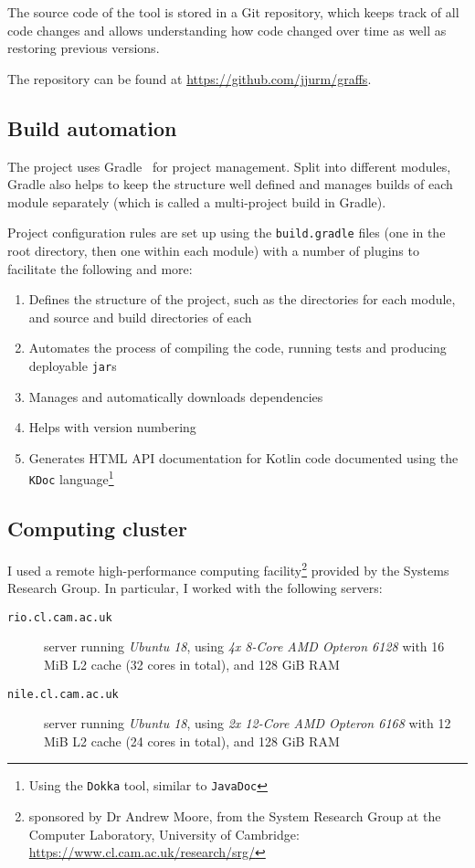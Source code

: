 The source code of the \graffs tool is stored in a Git repository, which keeps track of all code changes and allows understanding how code changed over time as well as restoring previous versions.

The repository can be found at \url{https://github.com/jjurm/graffs}.

\subsection{Build automation}

The project uses Gradle~\cite{BerglundBuildingTestingGradle2011} for project management.
Split into different modules, Gradle also helps to keep the structure well defined and manages builds of each module separately (which is called a multi-project build in Gradle).

Project configuration rules are set up using the \texttt{build.gradle} files (one in the root directory, then one within each module) with a number of plugins to facilitate the following and more:
\begin{enumerate}
    \item Defines the structure of the project, such as the directories for each module, and source and build directories of each
    \item Automates the process of compiling the code, running tests and producing deployable \texttt{jar}s
    \item Manages and automatically downloads dependencies
    \item Helps with version numbering
    \item Generates HTML API documentation for Kotlin code documented using the \texttt{KDoc} language\footnote{Using the \texttt{Dokka} tool, similar to \texttt{JavaDoc}}
\end{enumerate}

\subsection{Computing cluster}\label{sec:computing_cluster}

I used a remote high-performance computing facility\footnote{sponsored by Dr Andrew Moore, from the System Research Group at the Computer Laboratory, University of Cambridge: \url{https://www.cl.cam.ac.uk/research/srg/}} provided by the Systems Research Group.
In particular, I worked with the following servers:

\begin{description}
    \item[\texttt{rio.cl.cam.ac.uk}] server running \textsl{Ubuntu 18}, using \textsl{4x 8-Core AMD Opteron 6128} with 16 MiB L2 cache (32 cores in total), and 128 GiB RAM
    \item[\texttt{nile.cl.cam.ac.uk}] server running \textsl{Ubuntu 18}, using \textsl{2x 12-Core AMD Opteron 6168} with 12 MiB L2 cache (24 cores in total), and 128 GiB RAM
\end{description}

